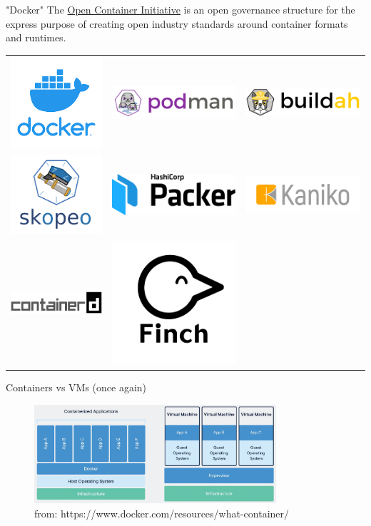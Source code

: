\documentclass[english]{tumbeamer}
\begin{document}
\begin{frame}{"Docker"}
The \href{https://opencontainers.org/}{Open Container Initiative} is an open governance structure for the express purpose of creating open industry standards around container formats and runtimes.
\centering \begin{tabular}{ccc}
\includegraphics[width=.1\linewidth]{docker.png} & 
\includegraphics[width=.2\linewidth]{podman.png} & 
\includegraphics[width=.2\linewidth]{buildah.png}\\
\includegraphics[width=.2\linewidth]{skopeo.png} &
\includegraphics[width=.2\linewidth]{packer.png} &
\includegraphics[width=.2\linewidth]{kaniko.png}\\
\includegraphics[width=.2\linewidth]{containerd.png} & 
\includegraphics[width=.1\linewidth]{finch.png} & 
\end{tabular}
\end{frame}

\begin{frame}{Containers vs VMs (once again)}
\begin{figure}
    \centering
    \includegraphics[width=0.8\textwidth]{container-vs-vms.png}
    \caption{from: https://www.docker.com/resources/what-container/ }
    \label{fig:my_label}
\end{figure}
\end{frame}
\end{document}

